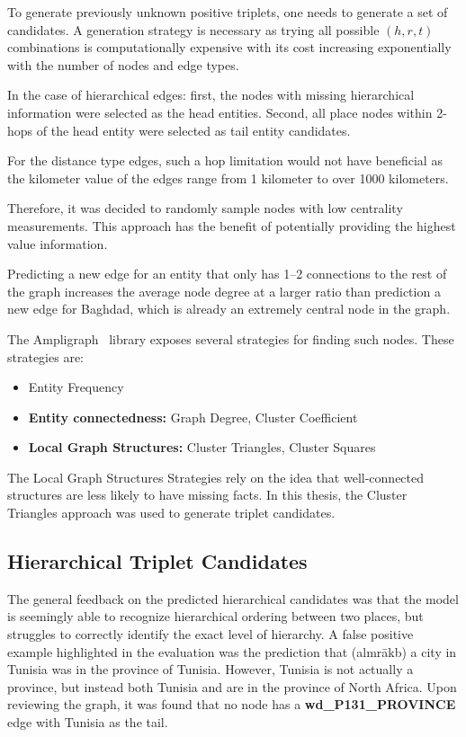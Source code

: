 To generate previously unknown positive triplets, one needs to generate a set of candidates.
A generation strategy is necessary as trying all possible $(h,r,t)$ combinations is computationally expensive
with its cost increasing exponentially with the number of nodes and edge types.

In the case of hierarchical edges: first,
the nodes with missing hierarchical information were selected as the head entities.
Second, all place nodes within 2-hops of the head entity were selected as tail entity candidates.

For the distance type edges, such a hop limitation would not have beneficial as the kilometer value of the edges range from
1 kilometer to over 1000 kilometers.

Therefore, it was decided to randomly sample nodes with low centrality measurements.
This approach has the benefit of potentially providing the highest value information.

Predicting a new edge for an entity that only has 1--2 connections to the rest of the graph
increases the average node degree at a larger ratio than prediction a new edge for Baghdad, which is
already an extremely central node in the graph.

The Ampligraph~\cite{ampligraph} library exposes several strategies for finding such nodes.
These strategies are:
\begin{itemize}
    \item Entity Frequency
    \item \textbf{Entity connectedness:} Graph Degree, Cluster Coefficient
    \item  \textbf{Local Graph Structures:} Cluster Triangles, Cluster Squares
\end{itemize}


The Local Graph Structures Strategies rely on the idea that well-connected structures are less likely to have missing facts.
In this thesis, the Cluster Triangles approach was used to generate triplet candidates.

\subsection{Hierarchical Triplet Candidates}
The general feedback on the predicted hierarchical candidates was that the model is seemingly able to recognize hierarchical
ordering between two places, but struggles to correctly identify the exact level of hierarchy.
A false positive example highlighted in the evaluation was the prediction that
 (almrākb) a city in Tunisia was in the province of Tunisia.
However, Tunisia is not actually a province, but instead both Tunisia and  are in the province of North Africa.
Upon reviewing the graph, it was found that no node has a \textbf{wd\_P131\_PROVINCE} edge with Tunisia as the tail.

